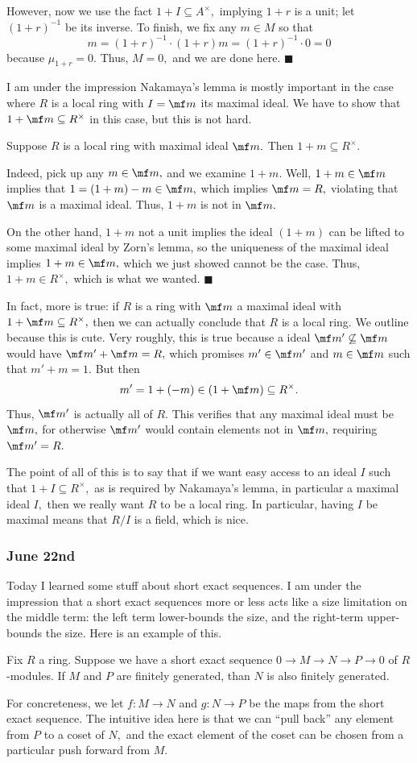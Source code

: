However, now we use the fact $1+I\subseteq A^\times,$ implying $1+r$ is a unit; let $(1+r)^{-1}$ be its inverse. To finish, we fix any $m\in M$ so that
\[m=(1+r)^{-1}\cdot(1+r)m=(1+r)^{-1}\cdot0=0\]
because $\mu_{1+r}=0.$ Thus, $M=0,$ and we are done here. $\blacksquare$

I am under the impression Nakamaya's lemma is mostly important in the case where $R$ is a local ring with $I=\mf m$ its maximal ideal. We have to show that $1+\mf m\subseteq R^\times$ in this case, but this is not hard.
\begin{lemma}
    Suppose $R$ is a local ring with maximal ideal $\mf m.$ Then $1+m\subseteq R^\times.$
\end{lemma}
Indeed, pick up any $m\in\mf m,$ and we examine $1+m.$ Well, $1+m\in\mf m$ implies that $1=(1+m)-m\in\mf m,$ which implies $\mf m=R,$ violating that $\mf m$ is a maximal ideal. Thus, $1+m$ is not in $\mf m.$

On the other hand, $1+m$ not a unit implies the ideal $(1+m)$ can be lifted to some maximal ideal by Zorn's lemma, so the uniqueness of the maximal ideal implies $1+m\in\mf m,$ which we just showed cannot be the case. Thus, $1+m\in R^\times,$ which is what we wanted. $\blacksquare$

In fact, more is true: if $R$ is a ring with $\mf m$ a maximal ideal with $1+\mf m\subseteq R^\times,$ then we can actually conclude that $R$ is a local ring. We outline because this is cute. Very roughly, this is true because a ideal $\mf m'\not\subseteq\mf m$ would have $\mf m'+\mf m=R,$ which promises $m'\in\mf m'$ and $m\in\mf m$ such that $m'+m=1.$ But then
\[m'=1+(-m)\in(1+\mf m)\subseteq R^\times.\]
Thus, $\mf m'$ is actually all of $R.$ This verifies that any maximal ideal must be $\mf m,$ for otherwise $\mf m'$ would contain elements not in $\mf m,$ requiring $\mf m'=R.$

The point of all of this is to say that if we want easy access to an ideal $I$ such that $1+I\subseteq R^\times,$ as is required by Nakamaya's lemma, in particular a maximal ideal $I,$ then we really want $R$ to be a local ring. In particular, having $I$ be maximal means that $R/I$ is a field, which is nice.

\subsubsection{June 22nd}
Today I learned some stuff about short exact sequences. I am under the impression that a short exact sequences more or less acts like a size limitation on the middle term: the left term lower-bounds the size, and the right-term upper-bounds the size. Here is an example of this.
\begin{proposition}
    Fix $R$ a ring. Suppose we have a short exact sequence $0\to M\to N\to P\to 0$ of $R$-modules. If $M$ and $P$ are finitely generated, than $N$ is also finitely generated.
\end{proposition}
For concreteness, we let $f:M\to N$ and $g:N\to P$ be the maps from the short exact sequence. The intuitive idea here is that we can ``pull back'' any element from $P$ to a coset of $N,$ and the exact element of the coset can be chosen from a particular push forward from $M.$

